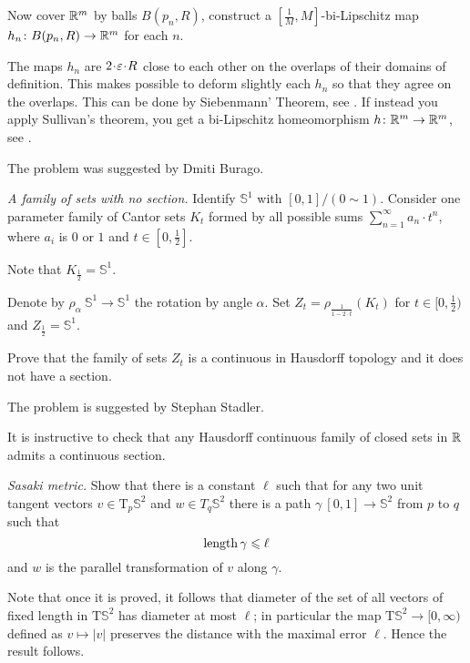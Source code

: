 Now cover $\mathbb{R}^m$ by balls
$B(p_n,R)$, construct a $[\tfrac1M,M]$-bi-Lipschitz map $h_n\colon B(p_n,R)\to \mathbb{R}^m$ for each $n$.

The maps $h_n$ are $2\cdot \eps\cdot R$ close to each other on the overlaps of their domains of definition.
This makes possible to deform slightly each $h_n$ so that they agree on the overlaps.
This can be done by Siebenmann' Theorem, see \cite{siebenmann}.
If instead you apply Sullivan's theorem, you get a bi-Lipschitz homeomorphism $h\colon\mathbb{R}^m\to\mathbb{R}^m$,
see \cite{sullivan}.


The problem was suggested by Dmiti Burago.





\textit{A family of sets with no section.}
Identify $\mathbb{S}^1$ with $[0,1]/(0\sim 1)$.
Consider one parameter family of Cantor sets $K_t$
formed by all possible sums $\sum_{n=1}^\infty a_n\cdot t^n$,
where $a_i$ is $0$ or $1$ and $t\in[0,\tfrac12]$.

Note that $K_{\frac12}=\mathbb{S}^1$.

Denote by $\rho_\alpha\:\mathbb{S}^1\to\mathbb{S}^1$ 
the rotation by angle $\alpha$.
Set $Z_t=\rho_{\frac1{1-2\cdot t}}(K_t)$ for $t\in[0,\tfrac12)$ and $Z_{\frac12}=\mathbb{S}^1$.

Prove that the family of sets $Z_t$
is a continuous in Hausdorff topology and it does not have a section.

 The problem is suggested by Stephan Stadler.

It is instructive to check that any Hausdorff continuous family of closed sets in $\mathbb{R}$ admits a continuous section.



\textit{Sasaki metric.}
Show that there is a constant $\ell$
such that for any two unit tangent vectors $v\in\mathrm{T}_p\mathbb{S}^2$ 
and $w\in T_q\mathbb{S}^2$
there is a path 
$\gamma\:[0,1]\to\mathbb{S}^2$ from $p$ to $q$
such that 
\[\operatorname{\rm length} \gamma\leqslant \ell\] 
and
$w$ is the parallel transformation of $v$ along $\gamma$.

Note that once it is proved, 
it follows that diameter of the set of all vectors of fixed length in $\mathrm{T} \mathbb{S}^2$ has diameter at most $\ell$;
in particular the map $\mathrm{T}\mathbb{S}^2\to[0,\infty)$ defined as $v\mapsto |v|$ 
preserves the distance with the maximal error $\ell$.
Hence the result follows.


